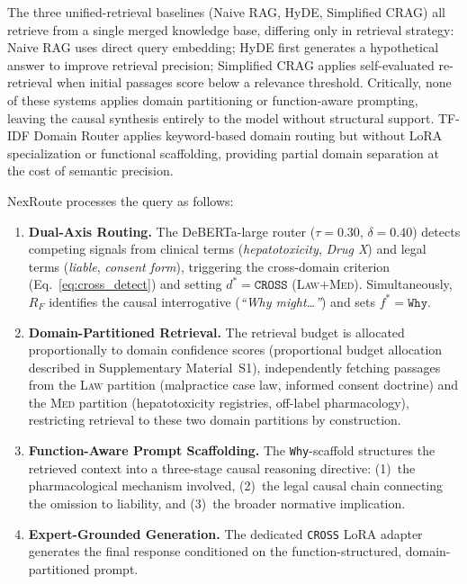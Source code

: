 \documentclass[a4paper,fleql,doubleblind]{cas-sc}
\begin{document}
The three unified-retrieval baselines (Naive RAG, HyDE, Simplified CRAG) all retrieve
from a single merged knowledge base, differing only in retrieval strategy:
Naive RAG uses direct query embedding; HyDE first generates a hypothetical
answer to improve retrieval precision; Simplified CRAG applies self-evaluated re-retrieval
when initial passages score below a relevance threshold. Critically, none of
these systems applies domain partitioning or function-aware prompting,
leaving the causal synthesis entirely to the model without structural support.
TF-IDF Domain Router applies keyword-based domain routing but without LoRA
specialization or functional scaffolding, providing partial domain separation
at the cost of semantic precision.

NexRoute processes the query as follows:
\begin{enumerate}
    \item \textbf{Dual-Axis Routing.} The DeBERTa-large router
    ($\tau{=}0.30$, $\delta{=}0.40$) detects competing signals from clinical
    terms (\textit{hepatotoxicity}, \textit{Drug X}) and legal terms
    (\textit{liable}, \textit{consent form}), triggering the cross-domain
    criterion (Eq.~\ref{eq:cross_detect}) and setting $d^* = \texttt{CROSS}$
    (\textsc{Law}$+$\textsc{Med}). Simultaneously, $R_F$ identifies the causal
    interrogative (\textit{``Why might\ldots''}) and sets
    $f^* = \texttt{Why}$.

    \item \textbf{Domain-Partitioned Retrieval.} The retrieval budget is
    allocated proportionally to domain confidence scores
    (proportional budget allocation described in Supplementary Material~S1),
    independently fetching passages from the
    \textsc{Law} partition (malpractice case law, informed consent doctrine)
    and the \textsc{Med} partition (hepatotoxicity registries, off-label
    pharmacology), restricting retrieval to these two domain partitions by construction.

    \item \textbf{Function-Aware Prompt Scaffolding.} The \texttt{Why}-scaffold
    structures the retrieved context into a three-stage causal reasoning
    directive: (1)~the pharmacological mechanism involved, (2)~the legal causal
    chain connecting the omission to liability, and (3)~the broader normative
    implication.

    \item \textbf{Expert-Grounded Generation.} The dedicated \texttt{CROSS}
    LoRA adapter generates the final response conditioned on the
    function-structured, domain-partitioned prompt.
\end{enumerate}
\end{document}

